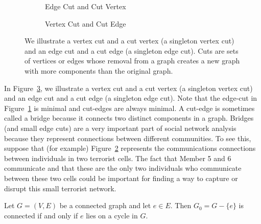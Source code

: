 \begin{figure}
\centering
\begin{subfigure}{0.49\textwidth}
  \centering
  
  \caption{\label{fig:g9a}{Edge Cut and Cut Vertex}}

\end{subfigure}
\begin{subfigure}{0.49\textwidth}
  \centering
  
  \caption{\label{fig:g9b} Vertex Cut and Cut Edge}
\end{subfigure}
\caption{\label{fig:g9}
We illustrate a vertex cut and a cut vertex (a singleton vertex cut) and an edge cut and a cut edge (a singleton edge cut).
Cuts are sets of vertices or edges whose removal from a graph creates a new graph with more components than the original graph.
}
\end{figure}
%
\begin{example}
In Figure~\ref{fig:g9}, we illustrate a vertex cut and a cut vertex (a singleton vertex cut) and an edge cut and a cut edge (a singleton edge cut).
Note that the edge-cut in Figure~\ref{fig:g9a} is minimal and cut-edges are always minimal.
A cut-edge is sometimes called a bridge because it connects two distinct components in a graph.
Bridges (and small edge cuts) are a very important part of social network analysis because they represent connections between different communities.
To see this, suppose that (for example) Figure~\ref{fig:g9b} represents the communications connections between individuals in two terrorist cells.
The fact that Member 5 and 6 communicate and that these are the only two individuals who communicate between these two cells could be important for finding a way to capture or disrupt this small terrorist network.
\end{example}
%
\begin{theorem}
Let \(G = (V,E)\) be a connected graph and let \(e \in E\).
Then \(G_0 = G-\{e\}\) is connected if and only if \(e\) lies on a cycle in \(G\).
\end{theorem}
%
